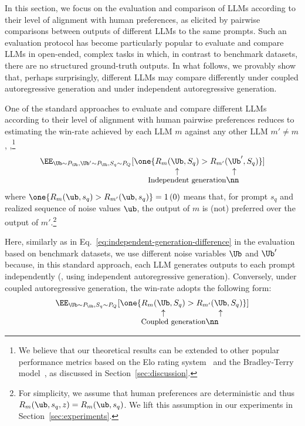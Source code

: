 In this section, we focus on the evaluation and comparison of LLMs according to their level of alignment with human preferences, as elicited by pairwise comparisons between outputs of different LLMs to the same prompts.
%
Such an evaluation protocol has become particularly popular to evaluate and compare LLMs in open-ended, complex tasks in which, in contrast to benchmark datasets, there are no structured ground-truth outputs.
%
In what follows, we provably show that, perhaps surprisingly, different LLMs may compare differently under coupled autoregressive generation and under independent autoregressive generation. 

One of the standard approaches to evaluate and compare different LLMs according to their level of alignment with human pairwise preferences reduces to estimating the win-rate achieved by each LLM $m$ against any other LLM $m' \neq m$, \ie,\footnote{We believe that our theoretical results can be extended to other popular performance metrics based on the Elo rating system~\cite{askell2021general,dettmers2024qlora,bai2022training,wu2023chatarena,lin2023llm} and the Bradley-Terry model~\cite{chiang2024chatbot,boyeau2024autoeval}, as discussed in Section~\ref{sec:discussion}.}
%
\begin{align} 
\EE_{\Ub\sim P_{\Ub}, \Ub'\sim P_{\Ub}, S_q\sim P_Q} [&\one\{R_{m}(\vertarrowbox{\Ub}{}, S_q) > R_{m'}(\vertarrowbox{\Ub}{}', S_q)\}] \label{eq:independent-generation-win-rates} \\[-4ex]
&\text{\small \hspace{5mm} Independent generation} \nn
\end{align}
%
where $\one\{R_m(\ub, s_q) > R_{m'}(\ub, s_q)\} = 1 \, (0)$ means that, for prompt $s_q$ and realized sequence of noise values $\ub$, the output of $m$ is (not) preferred over the output of $m'$.\footnote{For simplicity, we assume that human preferences are deterministic and thus $R_m(\ub, s_q, z) = R_m(\ub, s_q)$. We lift this assumption in our experiments in Section~\ref{sec:experiments}.}

Here, similarly as in Eq.~\ref{eq:independent-generation-difference} in the evaluation based on benchmark datasets, we use different noise variables $\Ub$ and $\Ub'$ because, in this standard approach, each LLM generates outputs to each prompt independently (\ie, using independent autoregressive generation).
%
Conversely, under coupled autoregressive generation, the win-rate adopts the following form:
%
\begin{align} 
\EE_{\Ub\sim P_{\Ub}, S_q\sim P_Q} [&\one\{R_{m}(\vertarrowbox{\Ub}{}, S_q) > R_{m'}(\vertarrowbox{\Ub}{}, S_q)\}] \label{eq:coupled-generation-win-rates} \\[-4ex]
&\text{\small \hspace{8mm} Coupled generation} \nn
\end{align}

